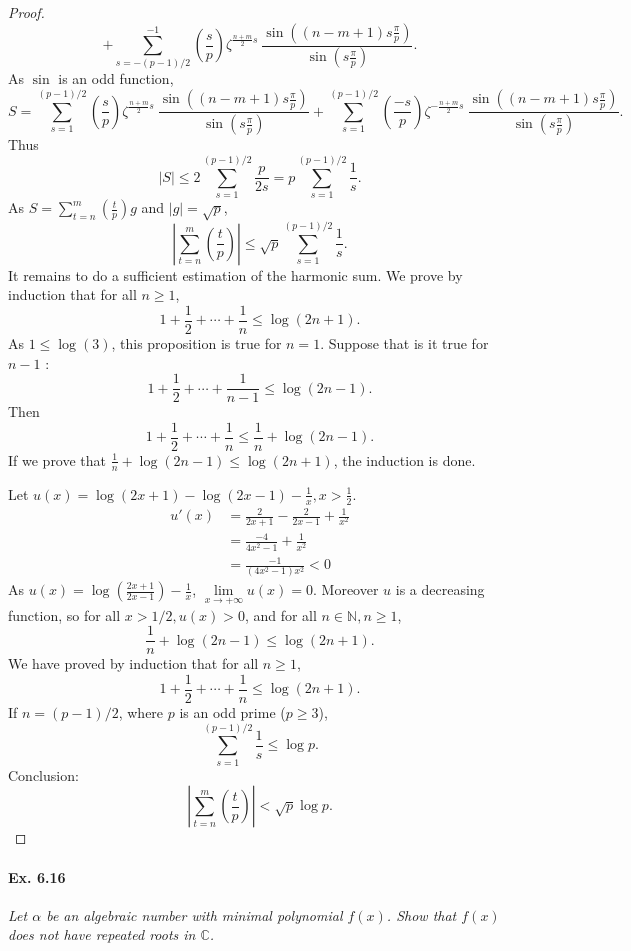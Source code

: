 \documentclass[11pt,a4paper]{article}
\newcommand{\N}{\mathbb{N}}
\newcommand{\C}{\mathbb{C}}
\newcommand{\legendre}[2]{\genfrac{(}{)}{}{}{#1}{#2}}
\begin{document}
\begin{proof}
$$+\sum_{s=-(p-1)/2}^{-1} \legendre{s}{p}\zeta^{\frac{n+m}{2} s} \ \frac{\sin \left((n-m+1)s \frac{\pi}{p}\right)} { \sin \left(s \frac{\pi}{p}\right) }.$$
As $\sin$ is an odd function,
$$S = \sum_{s=1}^{(p-1)/2}\legendre{s}{p}\zeta^{\frac{n+m}{2} s} \ \frac{\sin \left((n-m+1)s \frac{\pi}{p}\right)} { \sin \left(s \frac{\pi}{p}\right) }
+\sum_{s=1}^{(p-1)/2} \legendre{-s}{p}\zeta^{-\frac{n+m}{2} s} \ \frac{\sin \left((n-m+1)s \frac{\pi}{p}\right)} { \sin \left(s \frac{\pi}{p}\right) }.$$
Thus 
$$\vert S \vert \leq 2 \sum_{s=1}^{(p-1)/2}\frac{p}{2s} = p\sum_{s=1}^{(p-1)/2} \frac{1}{s}.$$
As $S = \sum\limits_{t = n}^m \legendre{t}{p} g$ and $|g| = \sqrt{p}$,
$$ \left|\sum_{t = n}^m \legendre{t}{p}\right| \leq \sqrt{p} \sum_{s=1}^{(p-1)/2} \frac{1}{s}.$$
It remains to do a sufficient estimation of the harmonic sum. 
We prove by induction that for all $n \geq 1$,
$$1+\frac{1}{2}+\cdots+\frac{1}{n} \leq \log(2n+1).$$
As $1 \leq \log(3)$, this proposition is true for $n=1$. Suppose that is it true for $n-1$ :
$$1+\frac{1}{2}+\cdots+\frac{1}{n-1} \leq \log(2n-1).$$
Then $$1+\frac{1}{2}+\cdots+\frac{1}{n} \leq \frac{1}{n} + \log(2n-1).$$
If we prove that $\frac{1}{n} + \log(2n-1) \leq \log(2n+1)$, the induction is done.

Let $u(x) = \log(2x+1) - \log(2x-1) - \frac{1}{x}, x > \frac{1}{2}$.
\begin{align*}
u'(x) &= \frac{2}{2x+1} - \frac{2}{2x-1} +\frac{1}{x^2}\\
&=\frac{-4}{4x^2-1} + \frac{1}{x^2}\\
&= \frac{-1}{(4x^2-1)x^2} <0
\end{align*}
As $u(x) = \log\left(\frac{2x+1}{2x-1}\right)  - \frac{1}{x}$, $ \lim\limits_{x\to +\infty} u(x) =0$. Moreover $u$ is a decreasing function, so for all $x>1/2, u(x)>0$, and for all $n\in \N, n\geq 1$,
$$\frac{1}{n} + \log(2n-1) \leq \log(2n+1).$$
We have proved by induction that for all $n\geq 1$,
$$1+\frac{1}{2}+\cdots+\frac{1}{n} \leq \log(2n+1).$$
If $n = (p-1)/2$, where $p$ is an odd prime ($p\geq 3$),
$$\sum_{s=1}^{(p-1)/2} \frac{1}{s} \leq \log p.$$
Conclusion: $$ \left|\sum_{t = n}^m \legendre{t}{p}\right| < \sqrt{p}\log p.$$
\end{proof}

\paragraph{Ex. 6.16}

{\it Let $\alpha$ be an algebraic number with minimal polynomial
$f(x)$. Show that $f(x)$ does not have repeated roots in $\C$.
}
\end{document}

